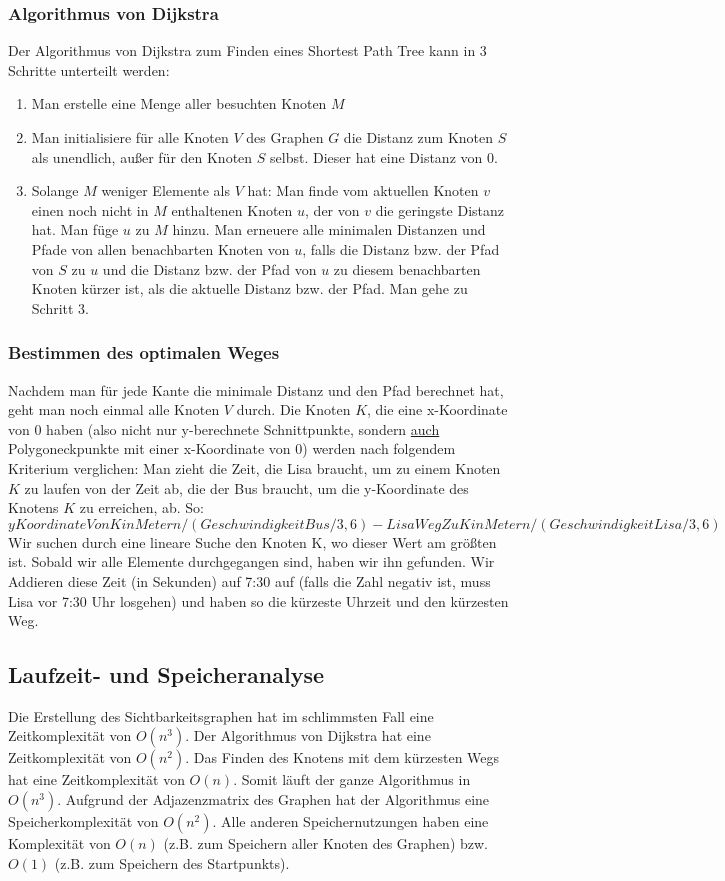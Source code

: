 \documentclass[a4paper,10pt,ngerman]{scrartcl}
\begin{document}
\subsubsection{Algorithmus von Dijkstra}
Der Algorithmus von Dijkstra zum Finden eines Shortest Path Tree kann in 3 Schritte unterteilt werden:
\begin{enumerate}
\item Man erstelle eine Menge aller besuchten Knoten $M$
\item Man initialisiere für alle Knoten $V$ des Graphen $G$ die Distanz zum Knoten $S$ als unendlich, außer für den Knoten $S$ selbst. Dieser hat eine Distanz von 0.
\item Solange $M$ weniger Elemente als $V$ hat: Man finde vom aktuellen Knoten $v$ einen noch nicht in $M$ enthaltenen Knoten $u$, der von $v$ die geringste Distanz hat. Man füge $u$ zu $M$ hinzu. Man erneuere alle minimalen Distanzen und Pfade von allen benachbarten Knoten von $u$, falls die Distanz bzw. der Pfad von $S$ zu $u$ und die Distanz bzw. der Pfad von $u$ zu diesem benachbarten Knoten kürzer ist, als die aktuelle Distanz bzw. der Pfad. Man gehe zu Schritt 3.
\end{enumerate}
\subsubsection{Bestimmen des optimalen Weges}
Nachdem man für jede Kante die minimale Distanz und den Pfad berechnet hat, geht man noch einmal alle Knoten $V$ durch. Die Knoten $K$, die eine x-Koordinate von $0$ haben (also nicht nur y-berechnete Schnittpunkte, sondern \underline{auch} Polygoneckpunkte mit einer x-Koordinate von $0$) werden nach folgendem Kriterium verglichen: Man zieht die Zeit, die Lisa braucht, um zu einem Knoten $K$ zu laufen von der Zeit ab, die der Bus braucht, um die y-Koordinate des Knotens $K$ zu erreichen, ab. So:
\[
yKoordinateVonKinMetern/(GeschwindigkeitBus/3,6)-LisaWegZuKinMetern/(GeschwindigkeitLisa/3,6)
\]
Wir suchen durch eine lineare Suche den Knoten K, wo dieser Wert am größten ist. Sobald wir alle Elemente durchgegangen sind, haben wir ihn gefunden. Wir Addieren diese Zeit (in Sekunden) auf 7:30 auf (falls die Zahl negativ ist, muss Lisa vor 7:30 Uhr losgehen) und haben so die kürzeste Uhrzeit und den kürzesten Weg.

\subsection{Laufzeit- und Speicheranalyse}
Die Erstellung des Sichtbarkeitsgraphen hat im schlimmsten Fall eine Zeitkomplexität von $O(n^3)$. Der Algorithmus von Dijkstra hat eine Zeitkomplexität von $O(n^2)$. Das Finden des Knotens mit dem kürzesten Wegs hat eine Zeitkomplexität von $O(n)$. Somit läuft der ganze Algorithmus in $O(n^3)$. \linebreak
Aufgrund der Adjazenzmatrix des Graphen hat der Algorithmus eine Speicherkomplexität von $O(n^2)$. Alle anderen Speichernutzungen haben eine Komplexität von $O(n)$ (z.B. zum Speichern aller Knoten des Graphen) bzw. $O(1)$ (z.B. zum Speichern des Startpunkts).
\end{document}
